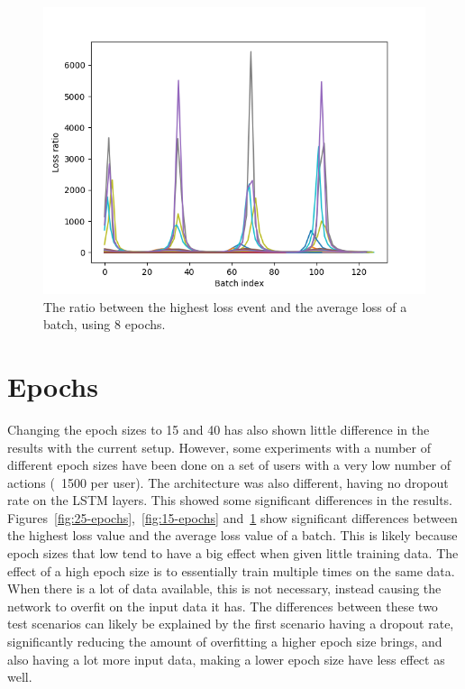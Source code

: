 \begin{figure}
	\begin{center}
		\includegraphics[scale=0.7]{experiments/epochs/8-epochs}
	\end{center}
	\caption{The ratio between the highest loss event and the average loss of a batch, using 8 epochs.~\label{fig:8-epochs}}
\end{figure}

\section{Epochs}
Changing the epoch sizes to 15 and 40 has also shown little difference in the results with the current setup. However, some experiments with a number of different epoch sizes have been done on a set of users with a very low number of actions (~1500 per user). The architecture was also different, having no dropout rate on the LSTM layers. This showed some significant differences in the results. Figures~\ref{fig:25-epochs},~\ref{fig:15-epochs} and~\ref{fig:8-epochs} show significant differences between the highest loss value and the average loss value of a batch. This is likely because epoch sizes that low tend to have a big effect when given little training data. The effect of a high epoch size is to essentially train multiple times on the same data. When there is a lot of data available, this is not necessary, instead causing the network to overfit on the input data it has. The differences between these two test scenarios can likely be explained by the first scenario having a dropout rate, significantly reducing the amount of overfitting a higher epoch size brings, and also having a lot more input data, making a lower epoch size have less effect as well.

